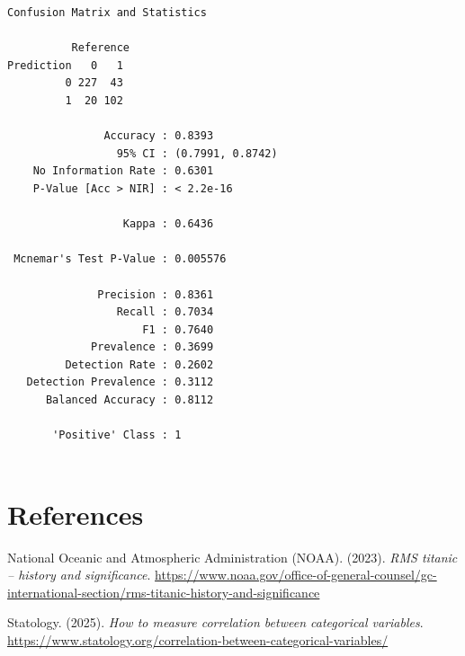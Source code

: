 \documentclass[
  letterpaper,
  DIV=11,
  numbers=noendperiod]{scrartcl}
\newlength{\cslhangindent}
\newenvironment{CSLReferences}[2] %
 {\begin{list}{}{%
  \setlength{\itemindent}{0pt}
  \setlength{\leftmargin}{0pt}
  \setlength{\parsep}{0pt}
  \ifodd #1
   \setlength{\leftmargin}{\cslhangindent}
   \setlength{\itemindent}{-1\cslhangindent}
  \fi
  \setlength{\itemsep}{#2\baselineskip}}}
 {\end{list}}
\begin{document}
\begin{verbatim}
Confusion Matrix and Statistics

          Reference
Prediction   0   1
         0 227  43
         1  20 102
                                          
               Accuracy : 0.8393          
                 95% CI : (0.7991, 0.8742)
    No Information Rate : 0.6301          
    P-Value [Acc > NIR] : < 2.2e-16       
                                          
                  Kappa : 0.6436          
                                          
 Mcnemar's Test P-Value : 0.005576        
                                          
              Precision : 0.8361          
                 Recall : 0.7034          
                     F1 : 0.7640          
             Prevalence : 0.3699          
         Detection Rate : 0.2602          
   Detection Prevalence : 0.3112          
      Balanced Accuracy : 0.8112          
                                          
       'Positive' Class : 1               
                                          
\end{verbatim}

\section*{References}\label{references}

\label{refs}
\begin{CSLReferences}{1}{0}
National Oceanic and Atmospheric Administration (NOAA). (2023).
\emph{RMS titanic -- history and significance}.
\url{https://www.noaa.gov/office-of-general-counsel/gc-international-section/rms-titanic-history-and-significance}

Statology. (2025). \emph{How to measure correlation between categorical
variables}.
\url{https://www.statology.org/correlation-between-categorical-variables/}

\end{CSLReferences}
\end{document}
